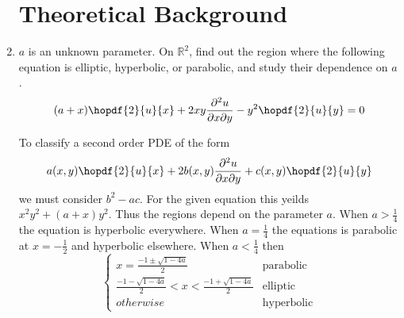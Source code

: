 \documentclass{article}
\newcommand\NoIndent[1]{%
  \begingroup
  \par
  \parshape0
  #1\par
  \endgroup
}
\begin{document}
\begin{enumerate}
\NoIndent{\section{Theoretical Background}}

	\item $a$ is an unknown parameter.
		On $\mathbb{R}^2$, find out the region where the following equation is
		elliptic, hyperbolic, or parabolic, and study their dependence on $a$.
		\begin{equation*}
			(a+x)\hopdf{2}{u}{x} + 2xy\frac{\partial^2 u}{\partial x \partial y}
				- y^2\hopdf{2}{u}{y} = 0
		\end{equation*}

\NoIndent{
	To classify a second order PDE of the form
	\begin{equation*}
		a(x,y)\hopdf{2}{u}{x} + 2b(x,y)\frac{\partial^2 u}{\partial x \partial y} + c(x,y)\hopdf{2}{u}{y}
	\end{equation*}
	we must consider $b^2 - ac$.
	For the given equation this yeilds $x^2 y^2 + (a+x)y^2$.
	Thus the regions depend on the parameter $a$.
	When $a > \frac{1}{4}$ the equation is hyperbolic everywhere.
	When $a = \frac{1}{4}$ the equations is parabolic at $x = -\frac{1}{2}$ and hyperbolic elsewhere.
	When $a < \frac{1}{4}$ then
	\begin{equation*}
		\begin{cases}
			x = \displaystyle\frac{-1 \pm \sqrt{1-4a}}{2}  & \mathrm{parabolic} \\
			\displaystyle\frac{-1 - \sqrt{1-4a}}{2} < x < \displaystyle\frac{-1 + \sqrt{1-4a}}{2}
				& \mathrm{elliptic} \\
			otherwise & \mathrm{hyperbolic}
		\end{cases}
	\end{equation*}
}


\end{enumerate}
\end{document}
